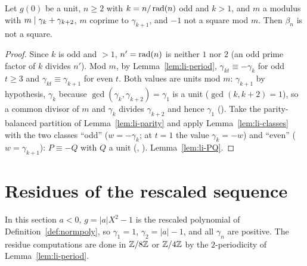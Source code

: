 \begin{proposition}
  \label{lem:li-odd}
  \leanok
  Let $g(0)$ be a unit, $n \ge 2$ with $k = n/\operatorname{rad}(n)$ odd and $k > 1$, and $m$ a modulus with
  $m \mathrel{\mid} \gamma_k + \gamma_{k+2}$, $m$ coprime to $\gamma_{k+1}$, and $-1$ not a square mod $m$.
  Then $\beta_n$ is not a square.
\end{proposition}
\begin{proof}
  \leanok
  Since $k$ is odd and $> 1$, $n' = \operatorname{rad}(n)$ is neither $1$ nor $2$ (an odd prime factor of $k$
  divides $n'$). Mod $m$, by Lemma~\ref{lem:li-period}, $\gamma_{kt} \equiv -\gamma_k$ for odd
  $t \ge 3$ and $\gamma_{kt} \equiv \gamma_{k+1}$ for even $t$. Both values are units mod $m$:
  $\gamma_{k+1}$ by hypothesis, $\gamma_k$ because $\gcd(\gamma_k, \gamma_{k+2}) = \gamma_1$ is a
  unit ($\gcd(k, k+2) = 1$), so a common divisor of $m$ and $\gamma_k$ divides $\gamma_{k+2}$ and
  hence $\gamma_1$ (). Take the
  parity-balanced partition of Lemma~\ref{lem:li-parity} and apply Lemma~\ref{lem:li-classes}
  with the two classes ``odd'' ($w = -\gamma_k$; at $t = 1$ the value $\gamma_k = -w$) and
  ``even'' ($w = \gamma_{k+1}$): $P \equiv -Q$ with $Q$ a unit
  (,
  ). Lemma~\ref{lem:li-PQ}.
\end{proof}

\section{Residues of the rescaled sequence}
\label{sec:li-residues}

In this section $a < 0$, $g = |a| X^2 - 1$ is the rescaled polynomial of
Definition~\ref{def:normpoly}, so $\gamma_1 = 1$, $\gamma_2 = |a| - 1$, and all $\gamma_n$ are
positive. The residue computations are done in $\mathbb{Z}/8\mathbb{Z}$ or $\mathbb{Z}/4\mathbb{Z}$ by the $2$-periodicity
of Lemma~\ref{lem:li-period}.

